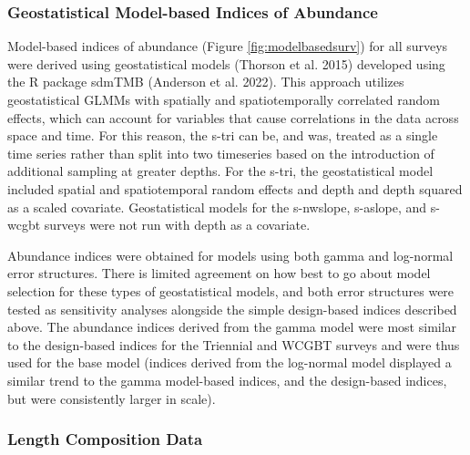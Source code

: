 \documentclass[11pt,
  english,
  letterpaper,
]{article}
\begin{document}
\hypertarget{geostatistical-model-based-indices-of-abundance}{%
\subsubsection{Geostatistical Model-based Indices of Abundance}\label{geostatistical-model-based-indices-of-abundance}}

Model-based indices of abundance (Figure \ref{fig:modelbasedsurv}) for all surveys were derived using geostatistical models (Thorson et al. 2015) developed using the R package sdmTMB (Anderson et al. 2022). This approach utilizes geostatistical GLMMs with spatially and spatiotemporally correlated random effects, which can account for variables that cause correlations in the data across space and time. For this reason, the \gls{s-tri} can be, and was, treated as a single time series rather than split into two timeseries based on the introduction of additional sampling at greater depths. For the \gls{s-tri}, the geostatistical model included spatial and spatiotemporal random effects and depth and depth squared as a scaled covariate. Geostatistical models for the \gls{s-nwslope}, \gls{s-aslope}, and \gls{s-wcgbt} surveys were not run with depth as a covariate.

Abundance indices were obtained for models using both gamma and log-normal error structures. There is limited agreement on how best to go about model selection for these types of geostatistical models, and both error structures were tested as sensitivity analyses alongside the simple design-based indices described above. The abundance indices derived from the gamma model were most similar to the design-based indices for the Triennial and WCGBT surveys and were thus used for the base model (indices derived from the log-normal model displayed a similar trend to the gamma model-based indices, and the design-based indices, but were consistently larger in scale).

\hypertarget{length-composition-data}{%
\subsubsection{Length Composition Data}\label{length-composition-data}}
\end{document}
